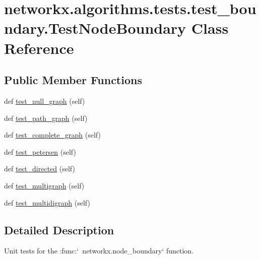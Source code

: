 \hypertarget{classnetworkx_1_1algorithms_1_1tests_1_1test__boundary_1_1TestNodeBoundary}{}\section{networkx.\+algorithms.\+tests.\+test\+\_\+boundary.\+Test\+Node\+Boundary Class Reference}
\label{classnetworkx_1_1algorithms_1_1tests_1_1test__boundary_1_1TestNodeBoundary}
\subsection*{Public Member Functions}
\begin{DoxyCompactItemize}
\item 
def \hyperlink{classnetworkx_1_1algorithms_1_1tests_1_1test__boundary_1_1TestNodeBoundary_a572562d599e660a5a32cc684e49d47d9}{test\+\_\+null\+\_\+graph} (self)
\item 
def \hyperlink{classnetworkx_1_1algorithms_1_1tests_1_1test__boundary_1_1TestNodeBoundary_a40e53f230405809d7bc57b06c0eb059e}{test\+\_\+path\+\_\+graph} (self)
\item 
def \hyperlink{classnetworkx_1_1algorithms_1_1tests_1_1test__boundary_1_1TestNodeBoundary_a23a4bb1323309b65867cfeb6bbce538b}{test\+\_\+complete\+\_\+graph} (self)
\item 
def \hyperlink{classnetworkx_1_1algorithms_1_1tests_1_1test__boundary_1_1TestNodeBoundary_a1dbef4a71b11ac2117ccc5de97b04e19}{test\+\_\+petersen} (self)
\item 
def \hyperlink{classnetworkx_1_1algorithms_1_1tests_1_1test__boundary_1_1TestNodeBoundary_a0cba16d1dec8117131d5bfab0e0b85a6}{test\+\_\+directed} (self)
\item 
def \hyperlink{classnetworkx_1_1algorithms_1_1tests_1_1test__boundary_1_1TestNodeBoundary_aa9d1f52ef326ee8b75167e5b28b13df7}{test\+\_\+multigraph} (self)
\item 
def \hyperlink{classnetworkx_1_1algorithms_1_1tests_1_1test__boundary_1_1TestNodeBoundary_ae1afbea4e09d11f0c2ce40bb439ade12}{test\+\_\+multidigraph} (self)
\end{DoxyCompactItemize}


\subsection{Detailed Description}
\begin{DoxyVerb}Unit tests for the :func:`~networkx.node_boundary` function.\end{DoxyVerb}
 

